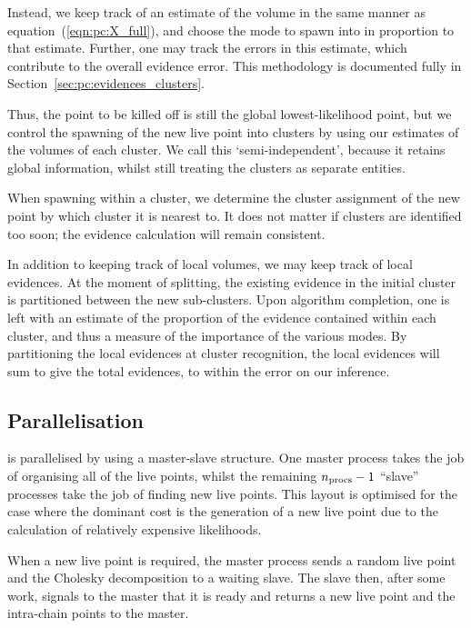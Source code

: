 Instead, we keep track of an estimate of the volume in the same manner as equation~(\ref{eqn:pc:X_full}), and choose the mode to spawn into in proportion to that estimate. Further, one may track the errors in this estimate, which contribute to the overall evidence error. This methodology is documented fully in Section~\ref{sec:pc:evidences_clusters}.

Thus, the point to be killed off is still the global lowest-likelihood point, but we control the spawning of the new live point into clusters by using our estimates of the volumes of each cluster. We call this `semi-independent', because it retains global information, whilst still treating the clusters as separate entities. 

When spawning within a cluster, we determine the cluster assignment of the new point by which cluster it is nearest to. It does not matter if clusters are identified too soon; the evidence calculation will remain consistent.

In addition to keeping track of local volumes, we may keep track of local evidences. At the moment of splitting, the existing evidence in the initial cluster is partitioned between the new sub-clusters. Upon algorithm completion, one is left with an estimate of the proportion of the evidence contained within each cluster, and thus a measure of the importance of the various modes. By partitioning the local evidences at cluster recognition, the local evidences will sum to give the total evidences, to within the error on our inference.


\subsection{Parallelisation}
\label{sec:pc:parallelisation}
\PolyChord{} is parallelised by \openMPI{} using a master-slave structure.  One master process takes the job of organising all of the live points, whilst the remaining ${n_{\mathrm{procs}}-1}$ ``slave'' processes take the job of finding new live points. This layout is optimised for the case where the dominant cost is the generation of a new live point due to the calculation of relatively expensive likelihoods.

When a new live point is required, the master process sends a random live point and the Cholesky decomposition to a waiting slave.  The slave then, after some work, signals to the master that it is ready and returns a new live point and the intra-chain points to the master.

